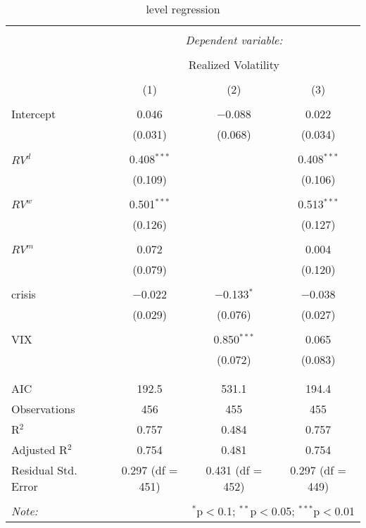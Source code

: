 
\begin{table}[!htbp] \centering 
  \caption{level regression} 
  \label{} 
\begin{tabular}{@{\extracolsep{5pt}}lccc} 
\\[-1.8ex]\hline 
\hline \\[-1.8ex] 
 & \multicolumn{3}{c}{\textit{Dependent variable:}} \\ 
\cline{2-4} 
\\[-1.8ex] & \multicolumn{3}{c}{Realized Volatility} \\ 
\\[-1.8ex] & (1) & (2) & (3)\\ 
\hline \\[-1.8ex] 
 Intercept & 0.046 & $-$0.088 & 0.022 \\ 
  & (0.031) & (0.068) & (0.034) \\ 
  & & & \\ 
 $RV^{d}$ & 0.408$^{***}$ &  & 0.408$^{***}$ \\ 
  & (0.109) &  & (0.106) \\ 
  & & & \\ 
 $RV^{w}$ & 0.501$^{***}$ &  & 0.513$^{***}$ \\ 
  & (0.126) &  & (0.127) \\ 
  & & & \\ 
 $RV^{m}$ & 0.072 &  & 0.004 \\ 
  & (0.079) &  & (0.120) \\ 
  & & & \\ 
 crisis & $-$0.022 & $-$0.133$^{*}$ & $-$0.038 \\ 
  & (0.029) & (0.076) & (0.027) \\ 
  & & & \\ 
 VIX &  & 0.850$^{***}$ & 0.065 \\ 
  &  & (0.072) & (0.083) \\ 
  & & & \\ 
\hline \\[-1.8ex] 
AIC & 192.5 & 531.1 & 194.4 \\ 
Observations & 456 & 455 & 455 \\ 
R$^{2}$ & 0.757 & 0.484 & 0.757 \\ 
Adjusted R$^{2}$ & 0.754 & 0.481 & 0.754 \\ 
Residual Std. Error & 0.297 (df = 451) & 0.431 (df = 452) & 0.297 (df = 449) \\ 
\hline 
\hline \\[-1.8ex] 
\textit{Note:}  & \multicolumn{3}{r}{$^{*}$p$<$0.1; $^{**}$p$<$0.05; $^{***}$p$<$0.01} \\ 
\end{tabular} 
\end{table} 
